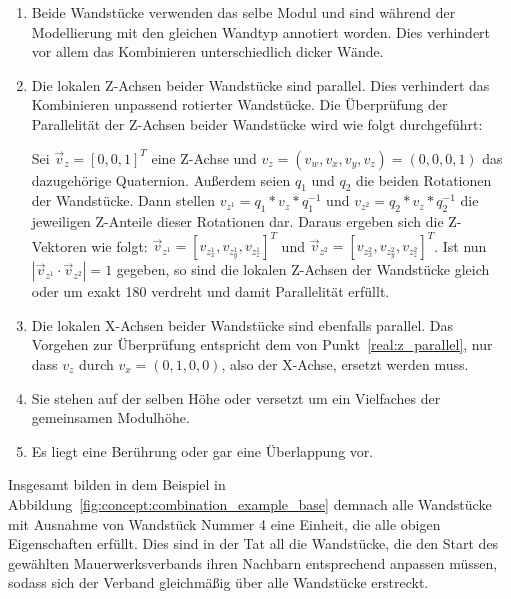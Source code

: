 \begin{enumerate}
    \item Beide Wandstücke verwenden das selbe Modul und sind während der Modellierung mit den gleichen Wandtyp annotiert worden. 
    Dies verhindert vor allem das Kombinieren unterschiedlich dicker Wände.
    \item\label{real:z_parallel} Die lokalen Z-Achsen beider Wandstücke sind parallel. 
    Dies verhindert das Kombinieren unpassend rotierter Wandstücke.
    Die Überprüfung der Parallelität der Z-Achsen beider Wandstücke wird wie folgt durchgeführt:

    Sei \(\vec{v}_z = {[0, 0, 1]}^T\)
    eine Z-Achse und \(v_z = (v_w, v_x, v_y, v_z) = (0, 0, 0, 1)\) das dazugehörige Quaternion. 
    Außerdem seien \(q_1\) und \(q_2\) die beiden Rotationen der Wandstücke. Dann stellen 
    \(v_{z^1} = q_1 * v_z * q_1^{-1}\) und 
    \(v_{z^2} = q_2 * v_z * q_2^{-1}\) die jeweiligen \glqq{}Z-Anteile\grqq{} dieser Rotationen dar.
    Daraus ergeben sich die \glqq{}Z-Vektoren\grqq{} wie folgt: 
    \(\vec{v}_{z^1} = {[v_{z^1_x}, v_{z^1_y}, v_{z^1_z}]}^T\) und
    \(\vec{v}_{z^2} = {[v_{z^2_x}, v_{z^2_y}, v_{z^2_z}]}^T\).
    Ist nun \(|\vec{v}_{z^1} \cdot \vec{v}_{z^2}| = 1\) gegeben, so sind die lokalen Z-Achsen der Wandstücke gleich oder um exakt 180\degree{} verdreht und damit Parallelität erfüllt.
    \item Die lokalen X-Achsen beider Wandstücke sind ebenfalls parallel. Das Vorgehen zur Überprüfung entspricht dem von Punkt~\ref{real:z_parallel}, nur dass \(v_z\) durch \(v_x = (0, 1, 0, 0)\), also der X-Achse, ersetzt werden muss.
    \item Sie stehen auf der selben Höhe oder versetzt um ein Vielfaches der gemeinsamen Modulhöhe.
    \item\label{concept:schichten} Es liegt eine Berührung oder gar eine Überlappung vor.
\end{enumerate}

Insgesamt bilden in dem Beispiel in Abbildung~\ref{fig:concept:combination_example_base} demnach alle Wandstücke mit Ausnahme von Wandstück Nummer 4 eine Einheit, die alle obigen Eigenschaften erfüllt.
Dies sind in der Tat all die Wandstücke, die den Start des gewählten Mauerwerksverbands ihren Nachbarn entsprechend anpassen müssen, sodass sich der Verband gleichmäßig über alle Wandstücke erstreckt.

